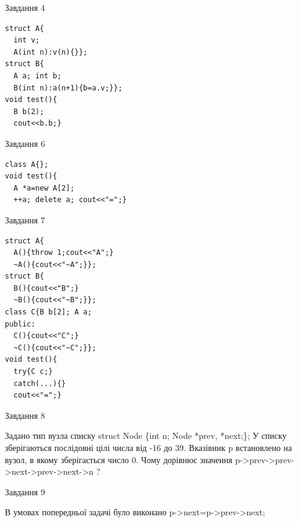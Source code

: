 \documentclass[12pt, ukrainian]{article}
\begin{document}
{{{{{{{{{{{{{{{{{\begin{minipage}[t]{7cm}
{\begin{center}Завдання {4}\end{center}}
\vspace{-6mm}

\begin{verbatim}
struct A{
  int v;
  A(int n):v(n){}};
struct B{
  A a; int b;
  B(int n):a(n+1){b=a.v;}};
void test(){
  B b(2);
  cout<<b.b;}
\end{verbatim}            


               
{\begin{center}Завдання {6}\end{center}}
\vspace{-6mm}

\begin{verbatim}
class A{};
void test(){
  A *a=new A[2]; 
  ++a; delete a; cout<<"=";} 
\end{verbatim}            


               
{\begin{center}Завдання {7}\end{center}}
\vspace{-6mm}

\begin{verbatim}
struct A{
  A(){throw 1;cout<<"A";}
  ~A(){cout<<"~A";}};
struct B{
  B(){cout<<"B";}
  ~B(){cout<<"~B";}};
class C{B b[2]; A a;
public:
  C(){cout<<"C";}
  ~C(){cout<<"~C";}};
void test(){
  try{C c;} 
  catch(...){} 
  cout<<"=";}
\end{verbatim}            


\end{minipage}
               
{\begin{center}Завдання {8}\end{center}}
\vspace{-6mm}
Задано тип вузла списку
struct Node \{int n; Node *prev, *next;\};
У списку зберігаються послідовні цілі числа від -16 до 39. Вказівник p встановлено на вузол, в якому зберігається число 0.
Чому дорівнює значення p->prev->prev->next->prev->next->n ?\par

               
{\begin{center}Завдання {9}\end{center}}
\vspace{-6mm}
В умовах попередньої задачі було виконано p->next=p->prev->next;

}}}}}}}}}}}}}}}}}
\end{document}
